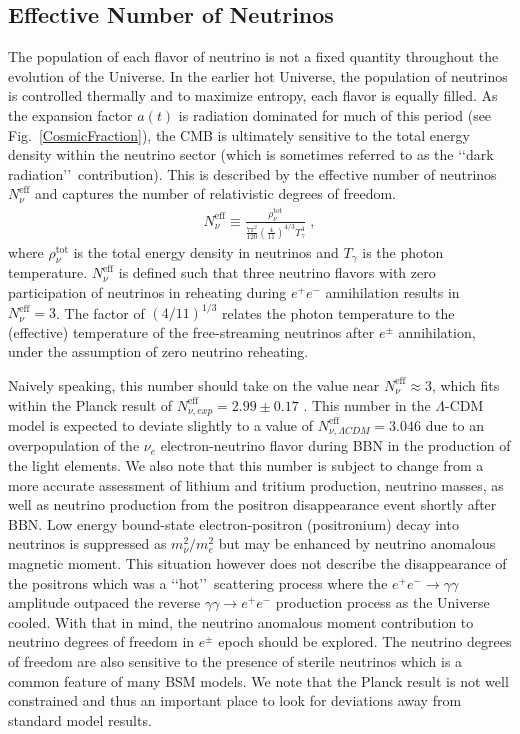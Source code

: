 \documentclass[universe,article,submit,moreauthors,pdftex,a4paper]{Definitions/mdpi}
\newcommand*{\rf}[1]{Fig.~{\ref{#1}}}
\begin{document}
\subsection{Effective Number of Neutrinos}\label{sec:EffectiveNeutrino}
\noindent The population of each flavor of neutrino is not a fixed quantity throughout the evolution of the Universe. In the earlier hot Universe, the population of neutrinos is controlled thermally and to maximize entropy, each flavor is equally filled. As the expansion factor $a(t)$ is radiation dominated for much of this period (see \rf{CosmicFraction}), the CMB is ultimately sensitive to the total energy density within the neutrino sector (which is sometimes referred to as the \lq\lq dark radiation\rq\rq\ contribution). This is described by the effective number of neutrinos $N_{\nu}^{\mathrm{eff}}$ and captures the number of relativistic degrees of freedom.
\begin{align}\label{Neff}
N_\nu^{\mathrm{eff}}\equiv\frac{\rho^{\mathrm{tot}}_\nu}{\frac{7\pi^2}{120}\left(\frac{4}{11}\right)^{4/3}T_\gamma^4}\;,
\end{align}
where $\rho_\nu^{\mathrm{tot}}$ is the total energy density in neutrinos and $T_\gamma$ is the photon temperature. $N_\nu^{\mathrm{eff}}$ is defined such that three neutrino flavors with zero participation of neutrinos in reheating during $e^+e^-$ annihilation results in $N_\nu^{\mathrm{eff}}=3$. The factor of $\left(4/11\right)^{1/3}$ relates the photon temperature to the (effective) temperature of the free-streaming neutrinos after $e^\pm$ annihilation, under the assumption of zero neutrino reheating.

Naively speaking, this number should take on the value near $N_{\nu}^{\mathrm{eff}}\approx3$, which fits within the Planck result of $N_{\nu, exp}^{\mathrm{eff}}=2.99\pm0.17$ \cite{Planck:2018vyg}. This number in the $\Lambda$-CDM model is expected to deviate slightly to a value of $N_{\nu, \Lambda CDM}^{\mathrm{eff}}=3.046$ due to an overpopulation of the $\nu_{e}$ electron-neutrino flavor during BBN in the production of the light elements. We also note that this number is subject to change from a more accurate assessment of lithium and tritium production, neutrino masses, as well as neutrino production from the positron disappearance event shortly after BBN. Low energy bound-state electron-positron (positronium) decay into neutrinos is suppressed as $m_{\nu}^{2}/m_{e}^{2}$ \cite{Govaerts:1996dt,Adkins:2022omi} but may be enhanced by neutrino anomalous magnetic moment. This situation however does not describe the disappearance of the positrons which was a \lq\lq hot\rq\rq\ scattering process where the $e^{+}e^{-}\rightarrow\gamma\gamma$ amplitude outpaced the reverse $\gamma\gamma\rightarrow e^{+}e^{-}$ production process as the Universe cooled. With that in mind, the neutrino anomalous moment contribution to neutrino degrees of freedom in $e^{\pm}$ epoch should be explored. The neutrino degrees of freedom are also sensitive to the presence of sterile neutrinos which is a common feature of many BSM models. We note that the Planck result is not well constrained and thus an important place to look for deviations away from standard model results.
\end{document}
